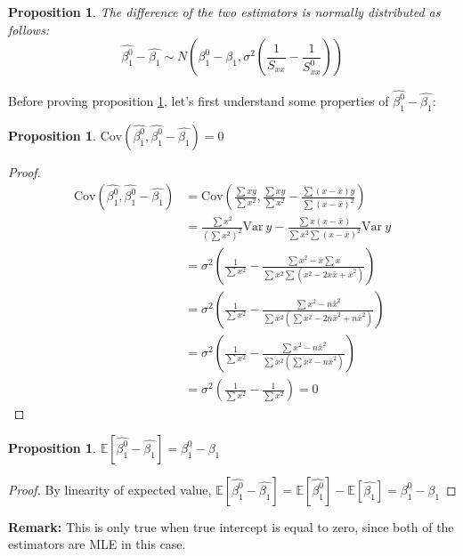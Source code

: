 \documentclass[12pt,a4paper,oneside]{book} %
\newtheorem{proposition}[theorem]{Proposition}
\newcommand{\E}{\mathbb{E}}
\newcommand{\Var}{\mathrm{Var}}
\newcommand{\Cov}{\mathrm{Cov}}
\begin{document}
\begin{proposition} \label{prop:normally}
	The difference of the two estimators is normally distributed as follows: 
	\[
		\hat{\beta_1^0}-\hat{\beta_1} \sim N(\beta_1^0-\beta_1, \sigma^2(\frac{1}{S_{xx}}-\frac{1}{S_{xx}^0}))
	\]
\end{proposition}

	Before proving proposition \ref{prop:normally}, let's first understand some properties of $\hat{\beta_1^0}-\hat{\beta_1}$:

\begin{proposition}
	$\Cov (\hat{\beta_1^0},\hat{\beta_1^0}-\hat{\beta_1})=0$
\end{proposition}

\begin{proof}
	\begin{align*}
		\Cov (\hat{\beta_1^0},\hat{\beta_1^0}-\hat{\beta_1}) &=
		\Cov (\frac{\sum xy}{\sum x^2},\frac{\sum xy}{\sum x^2}-\frac{\sum (x-\bar{x})y}{\sum (x-\bar{x})^2})  \\
		&= \frac{\sum x^2}{(\sum x^2)^2} \Var\  y - \frac{\sum x(x-\bar{x})}{\sum x^2 \sum (x-\bar{x})^2} \Var \ y \\
		&=\sigma^2(\frac{1}{\sum x^2} - \frac{\sum x^2 - \bar{x}\sum x}{\sum x^2 \sum(x^2-2x\bar{x}+\bar{x}^2)}) \\
		&= \sigma^2 (\frac{1}{\sum x^2}-\frac{\sum x^2 - n \bar{x}^2}{\sum x^2(\sum x^2 - 2n\bar{x}^2+n\bar{x}^2)}) \\
		&=\sigma^2 (\frac{1}{\sum x^2}-\frac{\sum x^2 - n \bar{x}^2}{\sum x^2(\sum x^2 -n\bar{x}^2)}) \\
		&= \sigma^2(\frac{1}{\sum x^2}-\frac{1}{\sum x^2})=0
	\end{align*}
\end{proof}

\begin{proposition}
	$\E [\hat{\beta_1^0}-\hat{\beta_1}]=\beta_1^0-\beta_1$ 
\end{proposition}

\begin{proof}
	By linearity of expected value, $\E [\hat{\beta_1^0}-\hat{\beta_1}]= \E[\hat{\beta_1^0}] - \E[\hat{\beta_1}]= \beta_1^0-\beta_1 $
\end{proof}

\textbf{Remark:} This is only true when true intercept is equal to zero, since both of the estimators are MLE in this case.
	
\end{document}
